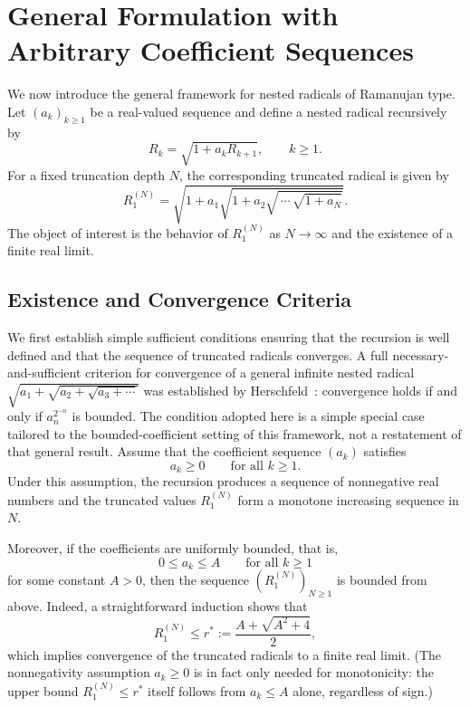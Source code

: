 \documentclass[11pt,a4paper]{amsart}
\theoremstyle{plain}
\theoremstyle{definition}
\theoremstyle{remark}
\begin{document}
\section{General Formulation with Arbitrary Coefficient Sequences}
\label{sec:general-framework}

We now introduce the general framework for nested radicals of Ramanujan type. Let $(a_k)_{k \geq 1}$ be a real-valued sequence and define a nested radical recursively by
\[
R_k = \sqrt{1 + a_k R_{k+1}}, \qquad k \geq 1.
\]
For a fixed truncation depth $N$, the corresponding truncated radical is given by
\[
R_1^{(N)} = \sqrt{1 + a_1 \sqrt{1 + a_2 \sqrt{\,\cdots\, \sqrt{1 + a_N}}}}.
\]
The object of interest is the behavior of $R_1^{(N)}$ as $N \to \infty$ and the existence of a finite real limit.

\subsection{Existence and Convergence Criteria}
\label{subsec:existence-convergence}

We first establish simple sufficient conditions ensuring that the recursion is well defined and that the sequence of truncated radicals converges. A full necessary-and-sufficient criterion for convergence of a general infinite nested radical $\sqrt{a_1+\sqrt{a_2+\sqrt{a_3+\cdots}}}$ was established by Herschfeld~\cite{Herschfeld1935}: convergence holds if and only if $a_n^{2^{-n}}$ is bounded. The condition adopted here is a simple special case tailored to the bounded-coefficient setting of this framework, not a restatement of that general result. Assume that the coefficient sequence $(a_k)$ satisfies
\[
a_k \geq 0 \qquad \text{for all } k \geq 1.
\]
Under this assumption, the recursion produces a sequence of nonnegative real numbers and the truncated values $R_1^{(N)}$ form a monotone increasing sequence in $N$.

Moreover, if the coefficients are uniformly bounded, that is,
\[
0 \leq a_k \leq A \qquad \text{for all } k \geq 1
\]
for some constant $A > 0$, then the sequence $(R_1^{(N)})_{N \geq 1}$ is bounded from above. Indeed, a straightforward induction shows that
\[
R_1^{(N)} \leq r^{\ast} := \frac{A + \sqrt{A^2 + 4}}{2},
\]
which implies convergence of the truncated radicals to a finite real limit. (The nonnegativity assumption $a_k \ge 0$ is in fact only needed for monotonicity: the upper bound $R_1^{(N)} \le r^\ast$ itself follows from $a_k \le A$ alone, regardless of sign.)
\end{document}
